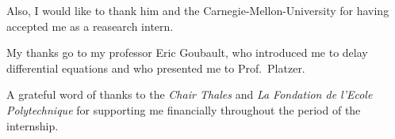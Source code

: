     Also, I would like to thank him and the Carnegie-Mellon-University for having accepted me as a reasearch intern. 

    My thanks go to my professor Eric Goubault, who introduced me to delay differential equations and who presented me to Prof.~Platzer.

    A grateful word of thanks to the \emph{Chair Thales} and \emph{La Fondation de l'Ecole Polytechnique} for supporting me financially throughout the period of the internship.
